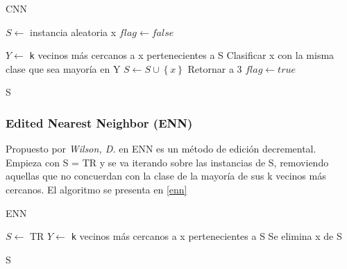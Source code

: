 \begin{algorithm}
\caption{CNN}
\label{cnn}
\begin{algorithmic}[1]


\State $S \gets$ instancia aleatoria x
\State $flag \gets false$

    \State $Y \gets$ \texttt{k} vecinos más cercanos a x pertenecientes a S 
    \State Clasificar x con la misma clase que sea mayoría en Y
      \State $S \gets S \cup \left\{x\right\}$
      \State Retornar a 3 
    \EndIf
  \EndFor
    \State $flag \gets true$
  \EndIf
\EndWhile

\Return S

\end{algorithmic}
\end{algorithm}


\subsubsection{Edited Nearest Neighbor (ENN)}

Propuesto por  \emph{Wilson, D.} en \cite{wilson1972asymptotic} ENN es un método de edición decremental. Empieza con S = TR y se va iterando sobre las instancias de S, removiendo aquellas que no concuerdan con la clase de la mayoría de sus k vecinos más cercanos. El algoritmo se presenta en \ref{enn}

\begin{algorithm}
\caption{ENN}
\label{enn}
\begin{algorithmic}[1]


\State $S \gets$ TR
  \State $Y \gets$ \texttt{k} vecinos más cercanos a x pertenecientes a S
    \State Se elimina x de S
  \EndIf
\EndFor

\Return S

\end{algorithmic}
\end{algorithm}

